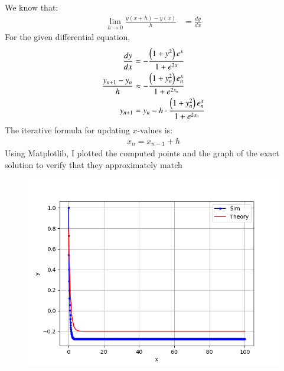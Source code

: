 \documentclass[journal]{IEEEtran}
\numberwithin{equation}{enumi}
\numberwithin{figure}{enumi}
\begin{document}
We know that:
\begin{align}
   \lim_{h \to 0} \frac{y(x+h) - y(x)}{h} &= \frac{dy}{dx} 
\end{align}
For the given differential equation,
\begin{align}
    \frac{dy}{dx}&=-\frac{\left(1+y^2\right)e^x}{1+e^{2x}}\\
    \frac{y_{n+1} - y_n}{h}&\approx -\frac{\left(1+y_n^2\right)e^x_n}{1+e^{2x_n}} \\
    y_{n+1} &= y_n - h \cdot \frac{\left(1+y_n^2\right)e^x_n}{1+e^{2x_n}}
\end{align}
The iterative formula for updating $x$-values is: 
\begin{align}
    x_n=x_{n-1}+h
\end{align}    
Using Matplotlib, I plotted the computed points and the graph of the exact solution to verify that they approximately match
\begin{figure}[h!]
	\centering
	\includegraphics[width=\columnwidth]{figs/Figure_1.png}
	\label{stemplot}
\end{figure}
\end{document}
